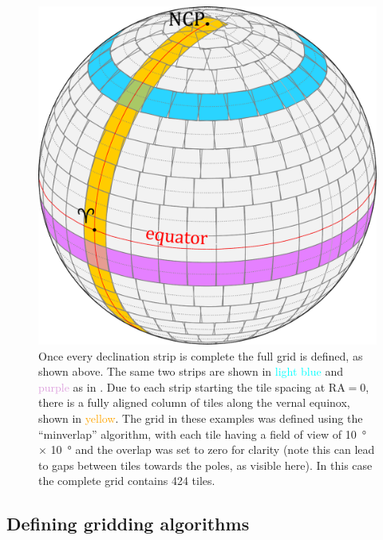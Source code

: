 \begin{colsection}
\begin{colsection}
\begin{figure}[p]
    \begin{center}
        \includegraphics[width=\linewidth]{images/globe4.pdf}
    \end{center}
    \caption[A fully tiled sphere]{
        Once every declination strip is complete the full grid is defined, as shown above. The same two strips are shown in \textcolor{cyan}{light blue} and \textcolor{Plum}{purple} as in . Due to each strip starting the tile spacing at RA$=0$, there is a fully aligned column of tiles along the vernal equinox, shown in \textcolor{orange}{yellow}. The grid in these examples was defined using the ``minverlap'' algorithm, with each tile having a field of view of \SI{10}{\degree} $\times$ \SI{10}{\degree} and the overlap was set to zero for clarity (note this can lead to gaps between tiles towards the poles, as visible here). In this case the complete grid contains 424 tiles.
    }\label{fig:tiledsphere}
\end{figure}

\newpage

\end{colsection}


\subsection{Defining gridding algorithms}
\label{sec:algorithms}
\begin{colsection}


\end{colsection}
\end{colsection}
